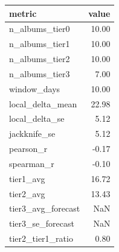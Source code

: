\begin{tabular}{lr}
\toprule
metric & value \\
\midrule
n\_albums\_tier0 & 10.00 \\
n\_albums\_tier1 & 10.00 \\
n\_albums\_tier2 & 10.00 \\
n\_albums\_tier3 & 7.00 \\
window\_days & 10.00 \\
local\_delta\_mean & 22.98 \\
local\_delta\_se & 5.12 \\
jackknife\_se & 5.12 \\
pearson\_r & -0.17 \\
spearman\_r & -0.10 \\
tier1\_avg & 16.72 \\
tier2\_avg & 13.43 \\
tier3\_avg\_forecast & NaN \\
tier3\_se\_forecast & NaN \\
tier2\_tier1\_ratio & 0.80 \\
\bottomrule
\end{tabular}
